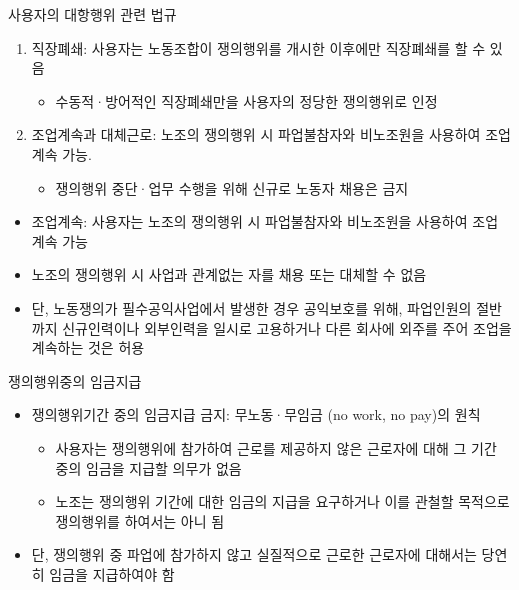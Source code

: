 \documentclass[aspectratio=169,xcolor=dvipsnames,handout]{beamer}
\begin{document}
\begin{frame}[allowframebreaks]{사용자의 대항행위 관련 법규}
    \begin{enumerate}[<+->]
        \item 직장폐쇄: 사용자는 노동조합이 쟁의행위를 개시한 이후에만 직장폐쇄를 할 수 있음
        \begin{itemize}[<+->]
            \item 수동적·방어적인 직장폐쇄만을 사용자의 정당한 쟁의행위로 인정
        \end{itemize}
        \item 조업계속과 대체근로: 노조의 쟁의행위 시 파업불참자와 비노조원을 사용하여 조업계속 가능.
        \begin{itemize}[<+->]
            \item 쟁의행위 중단·업무 수행을 위해 신규로 노동자 채용은 금지
        \end{itemize}
    \end{enumerate}
    \framebreak\relax
    \begin{itemize}[<+->]
        \item 조업계속: 사용자는 노조의 쟁의행위 시 파업불참자와 비노조원을 사용하여 조업 계속 가능
        \item 노조의 쟁의행위 시 사업과 관계없는 자를 채용 또는 대체할 수 없음
        \item 단, 노동쟁의가 필수공익사업에서 발생한 경우 공익보호를 위해, 파업인원의 절반까지 신규인력이나 외부인력을 일시로 고용하거나 다른 회사에 외주를 주어 조업을 계속하는 것은 허용
    \end{itemize}
\end{frame}

\begin{frame}{쟁의행위중의 임금지급}
    \begin{itemize}[<+->]
        \item 쟁의행위기간 중의 임금지급 금지: 무노동·무임금 (no work, no pay)의 원칙
        \begin{itemize}[<+->]
            \item 사용자는 쟁의행위에 참가하여 근로를 제공하지 않은 근로자에 대해 그 기간 중의 임금을 지급할 의무가 없음
            \item 노조는 쟁의행위 기간에 대한 임금의 지급을 요구하거나 이를 관철할 목적으로 쟁의행위를 하여서는 아니 됨
        \end{itemize}
    \item 단, 쟁의행위 중 파업에 참가하지 않고 실질적으로 근로한 근로자에 대해서는 당연히 임금을 지급하여야 함
    \end{itemize}
\end{frame}
\end{document}
